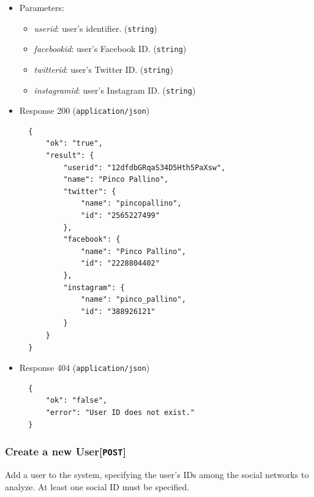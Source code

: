 \begin{itemize}
\item
  Parameters:

  \begin{itemize}
  \item
    \textit{userid}: user's identifier. (\texttt{string})
  \item
    \textit{facebookid}: user's Facebook ID. (\texttt{string})
  \item
    \textit{twitterid}: user's Twitter ID. (\texttt{string})
  \item
    \textit{instagramid}: user's Instagram ID. (\texttt{string})
  \end{itemize}
\item
  Response 200 (\texttt{application/json})

\begin{verbatim}
  {
      "ok": "true",
      "result": {
          "userid": "12dfdbGRqaS34D5Hth5PaXsw",
          "name": "Pinco Pallino",
          "twitter": {
              "name": "pincopallino",
              "id": "2565227499"
          },
          "facebook": {
              "name": "Pinco Pallino",
              "id": "2228804402"
          },
          "instagram": {
              "name": "pinco_pallino",
              "id": "388926121"
          }
      }
  }
\end{verbatim}
\item
  Response 404 (\texttt{application/json})

\begin{verbatim}
  {
      "ok": "false",
      "error": "User ID does not exist."
  }
\end{verbatim}
\end{itemize}

\subsubsection{Create a new User{[}\protect\texttt{POST}{]}}

Add a user to the system, specifying the user's IDs among the social networks to analyze. At least one social ID must be specified.

